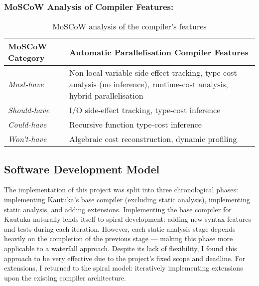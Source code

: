 \vspace{-2mm}

\subsubsection*{MoSCoW Analysis of Compiler Features:}

\begin{table}[h!]
  \centering
  \begin{tabular}{lp{95mm}}
    \toprule %
    \textbf{MoSCoW Category} & \textbf{Automatic Parallelisation Compiler Features}                                                                      \\
    \midrule %
    \textit{Must-have}       & Non-local variable side-effect tracking, type-cost analysis (no inference), runtime-cost analysis, hybrid parallelisation \\[2mm]
    \textit{Should-have}     & I/O side-effect tracking, type-cost inference                                                                             \\[2mm]
    \textit{Could-have}      & Recursive function type-cost inference                                                                                    \\[2mm]
    \textit{Won't-have}      & Algebraic cost reconstruction, dynamic profiling                                                                          \\
    \bottomrule
  \end{tabular}
  \label{tab:table2}
  \caption{MoSCoW analysis of the compiler's features}
\end{table}

\newpage

\subsection{Software Development Model}

\label{sec:2.7.2}

The implementation of this project was split into three chronological phases: implementing Kautuka's base compiler (excluding static analysis), implementing static analysis, and adding extensions. Implementing the base compiler for Kautuka naturally lends itself to spiral development: adding new syntax features and tests during each iteration. However, each static analysis stage depends heavily on the completion of the previous stage --- making this phase more applicable to a waterfall approach. Despite its lack of flexibility, I found this approach to be very effective due to the project's fixed scope and deadline. For extensions, I returned to the spiral model: iteratively implementing extensions upon the existing compiler architecture.

